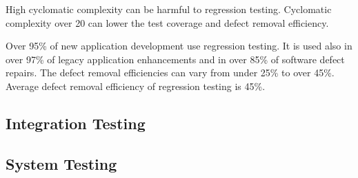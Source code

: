 High cyclomatic complexity can be harmful to regression testing. Cyclomatic complexity over 20 can lower the test coverage and defect removal efficiency.

Over 95\% of new application development use regression testing. It is used also in over 97\% of legacy application enhancements and in over 85\% of software defect repairs. The defect removal efficiencies can vary from under 25\% to over 45\%. Average defect removal efficiency of regression testing is 45\%.



 \subsection{Integration Testing}




 \subsection{System Testing}



